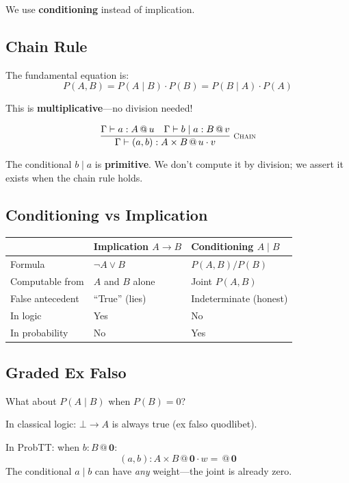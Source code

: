 \documentclass[11pt,a4paper]{article}
\makeatletter
\newcommand{\infer}[3][]{%
  \genfrac{}{}{0.4pt}{0}{#3}{#2}\;\textsc{\footnotesize #1}%
}
\newcommand{\at}[1]{\,@\,#1}
\newcommand{\zero}{\mathbf{0}}
\newcommand{\negw}{\neg}
\makeatother
\begin{document}
We use \textbf{conditioning} instead of implication.

\subsection{Chain Rule}

The fundamental equation is:
\[
P(A, B) = P(A \mid B) \cdot P(B) = P(B \mid A) \cdot P(A)
\]

This is \textbf{multiplicative}---no division needed!

\begin{gather}
\infer[\textsc{Chain}]
  {\Gamma \vdash (a, b) : A \times B \at{u \cdot v}}
  {\Gamma \vdash a : A \at{u} \quad \Gamma \vdash b \mid a : B \at{v}}
\end{gather}

The conditional $b \mid a$ is \textbf{primitive}. We don't compute it by division; we assert it exists when the chain rule holds.

\subsection{Conditioning vs Implication}

\begin{center}
\begin{tabular}{l|l|l}
& \textbf{Implication} $A \to B$ & \textbf{Conditioning} $A \mid B$ \\
\hline
Formula & $\negw A \vee B$ & $P(A,B) / P(B)$ \\
Computable from & $A$ and $B$ alone & Joint $P(A,B)$ \\
False antecedent & ``True'' (lies) & Indeterminate (honest) \\
In logic & Yes & No \\
In probability & No & Yes \\
\end{tabular}
\end{center}

\subsection{Graded Ex Falso}

What about $P(A \mid B)$ when $P(B) = 0$?

In classical logic: $\bot \to A$ is always true (ex falso quodlibet).

In ProbTT: when $b : B \at{\zero}$:
\[
(a, b) : A \times B \at{\zero \cdot w} = \at{\zero}
\]
The conditional $a \mid b$ can have \emph{any} weight---the joint is already zero.
\end{document}
